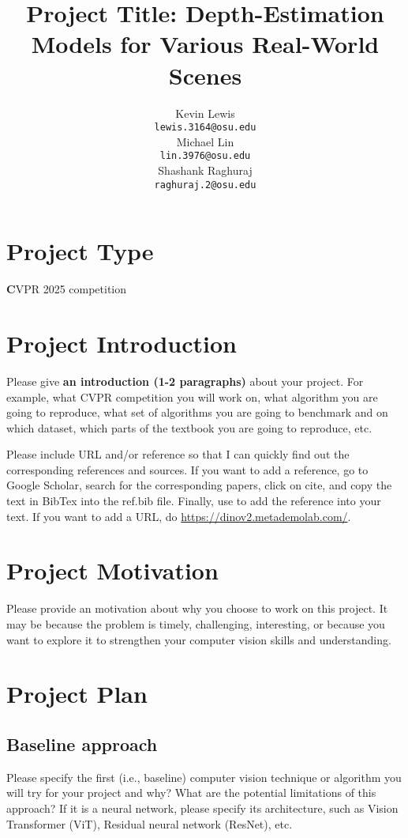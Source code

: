 \documentclass{article}
\title{Project Title: Depth-Estimation Models for Various Real-World Scenes}
\author{%
  Kevin Lewis\\
  \texttt{lewis.3164@osu.edu} \\
  \And
  Michael Lin\\
  \texttt{lin.3976@osu.edu} \\
    \And
  Shashank Raghuraj\\
  \texttt{raghuraj.2@osu.edu} \\
}
\begin{document}
\maketitle



\section{Project Type}
\textbf CVPR 2025 competition 

\section{Project Introduction}
{\color{red}
Please give \textbf{an introduction (1-2 paragraphs)} about your project. For example, what CVPR competition you will work on, what algorithm you are going to reproduce, what set of algorithms you are going to benchmark and on which dataset, which parts of the textbook you are going to reproduce, etc. 


Please include URL and/or reference so that I can quickly find out the corresponding references and sources. If you want to add a reference, go to Google Scholar, search for the corresponding papers, click on cite, and copy the text in BibTex into the ref.bib file. Finally, use \cite{oquab2023dinov2} to add the reference into your text. 
If you want to add a URL, do \url{https://dinov2.metademolab.com/}.

} 

\section{Project Motivation}
{\color{red}
Please provide an motivation about why you choose to work on this project. It may be because the problem is timely, challenging, interesting, or because you want to explore it to strengthen your computer vision skills and understanding.
} 

\section{Project Plan}
\subsection{Baseline approach}
{\color{red}
Please specify the first (i.e., baseline) computer vision technique or algorithm you will try for your project and why? What are the potential limitations of this approach? If it is a neural network, please specify its architecture, such as Vision Transformer (ViT), Residual neural network (ResNet), etc.
} 
\end{document}
